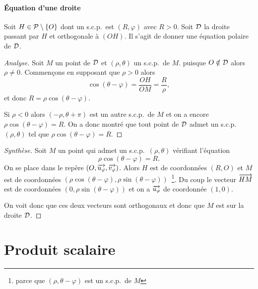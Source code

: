 \paragraph{Équation d'une droite}
\label{par:eqdroite}
Soit $H \in \P\setminus\{O\}$ dont un s.c.p.\ est $(R,\varphi)$ avec $R>0$. Soit $\Dr$ la droite passant par $H$ et orthogonale à $(OH)$. Il s'agit de donner une équation polaire de $\Dr$.
\begin{proof}[Analyse]
  Soit $M$ un point de $\Dr$ et $(\rho,\theta)$ un s.c.p.\ de $M$. puisque $O \notin \Dr$ alors $\rho \neq 0$. Commençons en supposant que $\rho>0$ alors
  \begin{equation}
    \cos(\theta-\varphi)=\frac{OH}{OM}=\frac{R}{\rho},
  \end{equation}
  et donc $R=\rho \cos(\theta-\varphi)$. 

  Si $\rho<0$ alors $(-\rho,\theta+\pi)$ est un autre s.c.p.\ de $M$ et on a encore $\rho\cos(\theta-\varphi)=R$. On a donc montré que tout point de $\Dr$ admet un s.c.p.\ $(\rho, \theta)$ tel que $\rho\cos(\theta-\varphi)=R$.
\end{proof}
\begin{proof}[Synthèse]
Soit $M$ un point qui admet un s.c.p.\ $(\rho,\theta)$ vérifiant l'équation
\begin{equation}
  \rho\cos(\theta-\varphi)=R.
\end{equation}
On se place dans le repère $(O,\vect{u_\varphi}, \vect{v_\varphi})$. Alors $H$ est de coordonnées $(R,O)$ et $M$ est de coordonnées $(\rho\cos(\theta-\varphi), \rho\sin(\theta-\varphi))$~\footnote{parce que $(\rho, \theta-\varphi)$ est un s.c.p.\ de $M$}. Du coup le vecteur $\vect{HM}$ est de coordonnées $(0, \rho\sin(\theta-\varphi))$ et on a $\vect{u_\varphi}$ de coordonnée $(1,0)$. 

On voit donc que ces deux vecteurs sont orthogonaux et donc que $M$ est sur la droite $\Dr$.
\end{proof}

\section{Produit scalaire}
\label{sec:prodscalaire}
